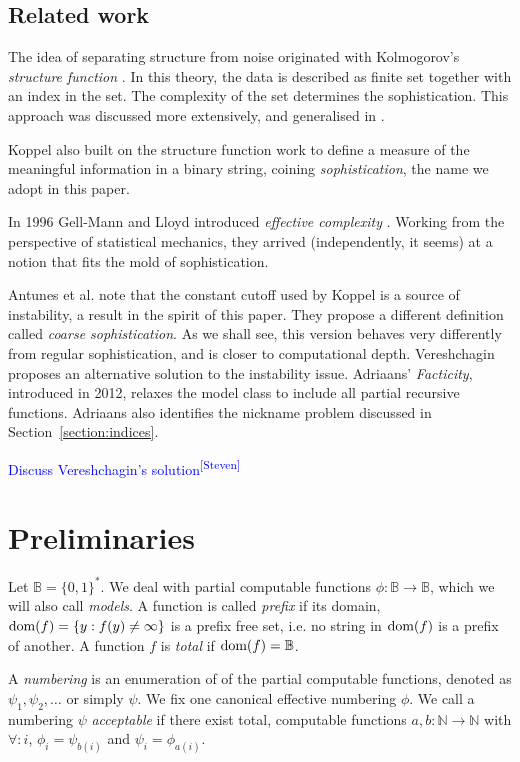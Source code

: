 \documentclass{style/llncs}
\newcommand{\B}{\mathbb B}
\newcommand{\N}{\mathbb N}
\newcommand{\tn}[1]{\textnormal{#1}}
\newcommand{\dom}[1]{\mathop{\tn{dom}(#1)}}
\newcommand{\sdr}[1]{\textcolor{blue}{\small #1\textsuperscript{[Steven]} }}
\begin{document}
\subsection{Related work}
The idea of separating structure from noise originated with Kolmogorov's \emph{structure function} \cite{cover1985kolmogorov}. In this theory, the data is described as finite set together with an index in the set. The complexity of the set determines the sophistication. This approach was discussed more extensively, and generalised in \cite{vereshchagin2004kolmogorov,gacs2001algorithmic}. 

Koppel \cite{koppelSoph1988,koppel1991almost} also built on the structure function work to define a measure of the meaningful information in a binary string, coining \emph{sophistication}, the name we adopt in this paper. 

In 1996 Gell-Mann and Lloyd introduced \emph{effective complexity} \cite{gellmann1996information}. Working from the perspective of statistical mechanics, they arrived (independently, it seems) at a notion that fits the mold of sophistication.


Antunes et al. \cite{antunes2009sophistication} note that the constant cutoff used by Koppel is a source of instability, a result in the spirit of this paper. They propose a different definition called \emph{coarse sophistication}. As we shall see, this version behaves very differently from regular sophistication, and is closer to computational depth. Vereshchagin \cite{vereshchagin2013algorithmic} proposes an alternative solution to the instability issue. Adriaans' \emph{Facticity}, introduced in 2012\cite{adriaans2012facticity}, relaxes the model class to include all partial recursive functions. Adriaans also identifies the nickname problem discussed in Section~\ref{section:indices}.

\sdr{Discuss Vereshchagin's solution}

\section{Preliminaries}
Let $\B = \{0,1\}^*$. We deal with partial computable functions $\phi: \B \to \B$, which we will also call \emph{models}. A function is called \emph{prefix} if its domain, $\dom{f} = \{y : f(y) \neq \infty\}$ is a prefix free set, i.e. no string in $\dom{f}$ is a prefix of another. A function $f$ is \emph{total} if $\dom{f} = \B$.

A \emph{numbering} is an enumeration of of the partial computable functions, denoted as $\psi_1, \psi_2, \ldots$ or simply $\psi$. We fix one canonical effective numbering $\phi$. We call a numbering $\psi$ \emph{acceptable} if there exist total, computable functions $a, b: \N \to \N$ with $\forall: i$, $\phi_i = \psi_{b(i)}$ and  $\psi_i = \phi_{a(i)}$.
\end{document}
